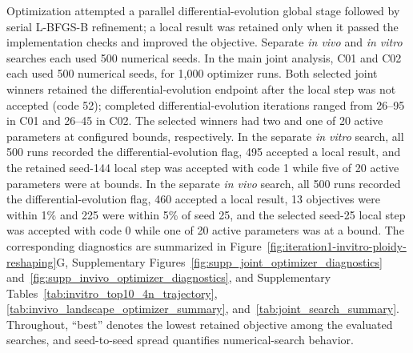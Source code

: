 \documentclass[11pt]{article}
\begin{document}
Optimization attempted a parallel differential-evolution global stage followed by serial L-BFGS-B refinement; a local result was retained only when it passed the implementation checks and improved the objective. Separate \textit{in vivo} and \textit{in vitro} searches each used 500 numerical seeds. In the main joint analysis, C01 and C02 each used 500 numerical seeds, for 1,000 optimizer runs. Both selected joint winners retained the differential-evolution endpoint after the local step was not accepted (code 52); completed differential-evolution iterations ranged from 26--95 in C01 and 26--45 in C02. The selected winners had two and one of 20 active parameters at configured bounds, respectively. In the separate \textit{in vitro} search, all 500 runs recorded the differential-evolution flag, 495 accepted a local result, and the retained seed-144 local step was accepted with code 1 while five of 20 active parameters were at bounds. In the separate \textit{in vivo} search, all 500 runs recorded the differential-evolution flag, 460 accepted a local result, 13 objectives were within 1\% and 225 were within 5\% of seed 25, and the selected seed-25 local step was accepted with code 0 while one of 20 active parameters was at a bound. The corresponding diagnostics are summarized in Figure~\ref{fig:iteration1-invitro-ploidy-reshaping}G, Supplementary Figures~\ref{fig:supp_joint_optimizer_diagnostics} and~\ref{fig:supp_invivo_optimizer_diagnostics}, and Supplementary Tables~\ref{tab:invitro_top10_4n_trajectory}, \ref{tab:invivo_landscape_optimizer_summary}, and~\ref{tab:joint_search_summary}. Throughout, ``best'' denotes the lowest retained objective among the evaluated searches, and seed-to-seed spread quantifies numerical-search behavior.
\end{document}
